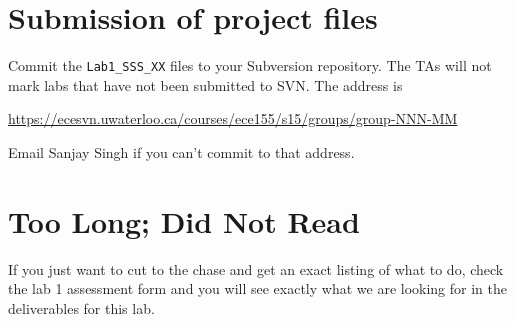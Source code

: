 \documentclass[10pt]{article}
\newcommand{\todo}[1]{{\red\textbf{TODO: }#1}\xspace}
\begin{document}
\section{Submission of project files}
Commit the {\tt Lab1\_SSS\_XX} files to your Subversion repository. The TAs will not mark labs that have not been submitted to SVN. The address is

\url{https://ecesvn.uwaterloo.ca/courses/ece155/s15/groups/group-NNN-MM}

Email Sanjay Singh if you can't commit to that address.


\section{Too Long; Did Not Read}
If you just want to cut to the chase and get an exact listing of what to do, check the lab 1 assessment form and you will see exactly what we are looking for in the deliverables for this lab.
\end{document}
